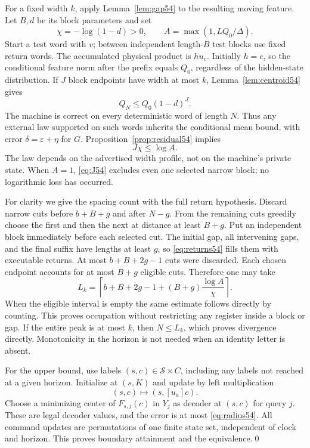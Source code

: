For a fixed width $k$, apply Lemma~\ref{lem:gap54} to the resulting moving feature. Let $B,d$ be its block parameters and set
\[
 \chi=-\log(1-d)>0,\qquad A=\max(1,LQ_0/\Delta).
\]
Start a test word with $v$; between independent length-$B$ test blocks use fixed return words. The accumulated physical product is $hu_v$. Initially $h=e$, so the conditional feature norm after the prefix equals $Q_0$, regardless of the hidden-state distribution. If $J$ block endpoints have width at most $k$, Lemma~\ref{lem:centroid54} gives
\[
 Q_N\le Q_0(1-d)^J.
\]
The machine is correct on every deterministic word of length $N$. Thus any external law supported on such words inherits the conditional mean bound, with error $\delta=\varepsilon+\eta$ for $G$. Proposition~\ref{prop:residual54} implies
\begin{equation}\label{eq:J54}
                         J\chi\le\log A.
\end{equation}
The law depends on the advertised width profile, not on the machine's private state. When $A=1$, \eqref{eq:J54} excludes even one selected narrow block; no logarithmic loss has occurred.

For clarity we give the spacing count with the full return hypothesis. Discard narrow cuts before $b+B+g$ and after $N-g$. From the remaining cuts greedily choose the first and then the next at distance at least $B+g$. Put an independent block immediately before each selected cut. The initial gap, all intervening gaps, and the final suffix have lengths at least $g$, so \eqref{eq:returns54} fills them with executable returns. At most $b+B+2g-1$ cuts were discarded. Each chosen endpoint accounts for at most $B+g$ eligible cuts. Therefore one may take
\begin{equation}\label{eq:Lk54}
 L_k=\left\lceil b+B+2g-1+(B+g)\frac{\log A}{\chi}\right\rceil.
\end{equation}
When the eligible interval is empty the same estimate follows directly by counting. This proves occupation without restricting any register inside a block or gap. If the entire peak is at most $k$, then $N\le L_k$, which proves divergence directly. Monotonicity in the horizon is not needed when an identity letter is absent.

For the upper bound, use labels $(s,c)\in\mathcal S\times C$, including any labels not reached at a given horizon. Initialize at $(s,K)$ and update by left multiplication
\[
 (s,c)\longmapsto(s,[u_a]c).
\]
Choose a minimizing center of $F_{s,j}(c)$ in $Y_j$ as decoder at $(s,c)$ for query $j$. These are legal decoder values, and the error is at most \eqref{eq:radius54}. All command updates are permutations of one finite state set, independent of clock and horizon. This proves boundary attainment and the equivalence.\qed

